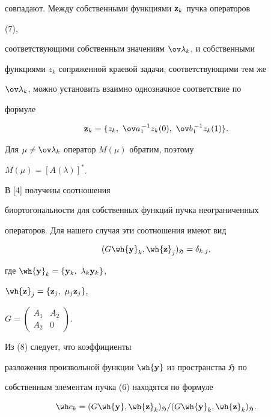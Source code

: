 совпадают. Между собственными функциями $\bold z_k$ пучка операторов 


(7),  


соответствующими собственным значениям $\ov\lambda_k$, и собственными  


функциями $z_k$ сопряженной краевой задачи, соответствующими тем же  


$\ov\lambda_k$, можно установить взаимно однозначное соответствие по 


формуле 


$$ 


\bold z_k=\{z_k,\ \ov a_1^{\,-1}z_k(0), 


\ \ov b_1^{\,-1}z_k(1)\}. 


$$ 


Для $\mu\ne\ov\lambda_k$ оператор $M(\mu)$ обратим, поэтому 


$M(\mu)=[A(\lambda)]^*$. 


 


В [4] получены соотношения  


биортогональности для собственных функций пучка неограниченных  


операторов. Для нашего случая эти соотношения имеют вид 


\begin{equation} 


(G\wh{\bold y}_k,\wh{\bold z}_j)_{\frak H}=\delta_{k,j}, 


\end{equation} 


где $\wh{\bold y}_k=\{\bold y_k,\ \lambda_k\bold y_k\}$, 


$\wh{\bold z}_j=\{\bold z_j,\ \mu_j\bold z_j\}$, 


$G=\left(\begin{smallmatrix} A_1 & A_2 \\ A_2 & 


0\end{smallmatrix}\right)$. 


Из (8) следует, что коэффициенты  


разложения произвольной функции $\wh{\bold y}$ из пространства $\frak 


H$ по  


собственным элементам пучка (6) находятся по формуле 


\begin{equation} 


\wh c_k=(G\wh{\bold y},\wh{\bold z}_k)_{\frak H}/ 


(G\wh{\bold y}_k,\wh{\bold z}_k)_{\frak H}. 


\end{equation} 


